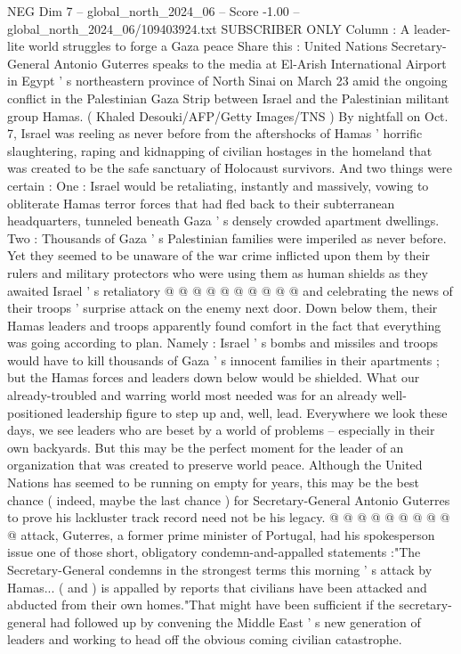 \begin{textsample}{NEG Dim 7 – global\_north\_2024\_06 – Score -1.00 – global\_north\_2024\_06/109403924.txt}  \label{ex:f7_neg_368}
SUBSCRIBER ONLY Column : A leader-lite world struggles to forge a Gaza peace Share this : United Nations Secretary-General Antonio Guterres speaks to the media at El-Arish International Airport in Egypt ' s northeastern province of North Sinai on March 23 amid the ongoing conflict in the Palestinian Gaza Strip between Israel and the Palestinian militant group Hamas. ( Khaled Desouki/AFP/Getty Images/TNS ) By nightfall on Oct. 7, Israel was reeling as never before from the aftershocks of Hamas ' horrific slaughtering, raping and kidnapping of civilian hostages in the homeland that was created to be the safe sanctuary of Holocaust survivors.
And two things were certain : One : Israel would be retaliating, instantly and massively, vowing to obliterate Hamas terror forces that had fled back to their subterranean headquarters, tunneled beneath Gaza ' s densely crowded apartment dwellings.
Two : Thousands of Gaza ' s Palestinian families were imperiled as never before.
Yet they seemed to be unaware of the war crime inflicted upon them by their rulers and military protectors who were using them as human shields as they awaited Israel ' s retaliatory @ @ @ @ @ @ @ @ @ @ and celebrating the news of their troops ' surprise attack on the enemy next door.
Down below them, their Hamas leaders and troops apparently found comfort in the fact that everything was going according to plan.
Namely : Israel ' s bombs and missiles and troops would have to kill thousands of Gaza ' s innocent families in their apartments ; but the Hamas forces and leaders down below would be shielded.
What our already-troubled and warring world most needed was for an already well-positioned leadership figure to step up and, well, lead.
Everywhere we look these days, we see leaders who are beset by a world of problems -- especially in their own backyards.
But this may be the perfect moment for the leader of an organization that was created to preserve world peace.
Although the United Nations has seemed to be running on empty for years, this may be the best chance ( indeed, maybe the last chance ) for Secretary-General Antonio Guterres to prove his lackluster track record need not be his legacy. @ @ @ @ @ @ @ @ @ @ attack, Guterres, a former prime minister of Portugal, had his spokesperson issue one of those short, obligatory condemn-and-appalled statements :"The Secretary-General condemns in the strongest terms this morning ' s attack by Hamas... ( and ) is appalled by reports that civilians have been attacked and abducted from their own homes."That might have been sufficient if the secretary-general had followed up by convening the Middle East ' s new generation of leaders and working to head off the obvious coming civilian catastrophe.

\end{textsample}
